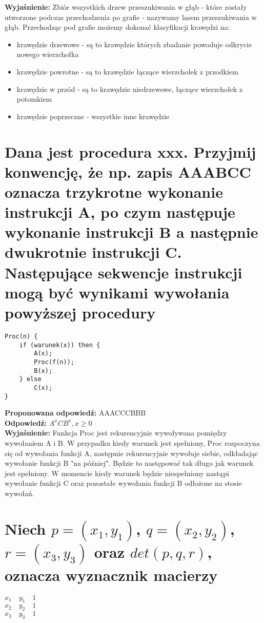\noindent \textbf{Wyjaśnienie:}
Zbiór wszystkich drzew przeszukiwania w głąb - które zostały utworzone podczas przechodzenia po grafie - nazywamy lasem przeszukiwania w głąb.
Przechodząc pod grafie możemy dokonać klasyfikacji krawędzi na:
\begin{itemize}
	\item krawędzie drzewowe - są to krawędzie których zbadanie powoduje odkrycie nowego wierzchołka
	\item krawędzie powrotne - są to krawędzie łączące wierzchołek z przodkiem
	\item krawędzie w przód - są to krawędzie niedrzewowe, łączące wierzchołek z potomkiem
	\item krawędzie poprzeczne - wszystkie inne krawędzie
\end{itemize}  


\section{Dana jest procedura xxx. Przyjmij konwencję, że np. zapis AAABCC oznacza trzykrotne wykonanie instrukcji A, po czym następuje wykonanie instrukcji B a następnie dwukrotnie instrukcji C. Następujące sekwencje instrukcji mogą być wynikami wywołania powyższej procedury}
\begin{lstlisting}
Proc(n) {
	if (warunek(x)) then {
		A(x);
		Proc(f(n));
		B(x);
	} else
		C(x);
}
\end{lstlisting}

\vspace{0.4cm}
\noindent \textbf{Proponowana odpowiedź:} AAACCCBBB \\ 

\noindent \textbf{Odpowiedź:} $A^xCB^x, x \ge 0$ \\

\noindent \textbf{Wyjaśnienie:}
Funkcja Proc jest rekurencyjnie wywoływana pomiędzy wywołaniem A i B. W przypadku kiedy warunek jest spełniony, Proc rozpoczyna się od wywołania funkcji A, następnie rekurencyjnie wywołuje siebie, odkładając wywołanie funkcji B "na później". Będzie to następować tak długo jak warunek jest spełniony. W momencie kiedy warunek będzie niespełniony nastąpi wywołanie funkcji C oraz pozostałe wywołania funkcji B odłożone na stosie wywołań. \\

\section{Niech $p=(x_1, y_1)$, $q=(x_2, y_2)$, $r=(x_3, y_3)$ oraz $det(p, q, r)$, oznacza wyznacznik macierzy}
\noindent $x_1 \quad y_1 \quad 1$ \\
$x_2 \quad y_2 \quad 1$ \\
$x_3 \quad y_3 \quad 1$


